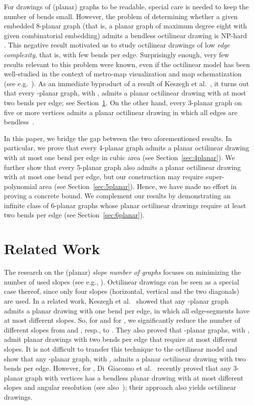 \documentclass[a4paper,twoside,11pt]{article}
\begin{document}
For drawings of (planar) graphs to be readable, special care is
needed to keep the number of bends small. However, the problem of
determining whether a given embedded 8-planar graph (that is, a
planar graph of maximum degree eight with given combinatorial
embedding) admits a bendless octilinear drawing is NP-hard
\cite{Noellenburg05}. This negative result motivated us to study
octilinear drawings of low \emph{edge complexity}, that is, with few
bends per edge. Surprisingly enough, very few results relevant to
this problem were known, even if the octilinear model has been
well-studied in the context of metro-map visualization and map
schematization (see e.g.~\cite{Wolff13}). As an immediate byproduct
of a result of Keszegh et al.~\cite{KPP13}, it turns out that every
-planar graph, with , admits a planar octilinear
drawing with at most two bends per edge; see
Section~\ref{sec:relatedwork}. On the other hand, every 3-planar
graph on five or more vertices admits a planar octilinear drawing in
which all edges are bendless~\cite{GLM14,Kant92}.

In this paper, we bridge the gap between the two aforementioned
results. In particular, we prove that every 4-planar graph admits a
planar octilinear drawing with at most one bend per edge in cubic
area (see Section~\ref{sec:4planar}). We further show that every
5-planar graph also admits a planar octilinear drawing with at most
one bend per edge, but our construction may require super-polynomial
area (see Section~\ref{sec:5planar}). Hence, we have made no effort
in proving a concrete bound. We complement our results by
demonstrating an infinite class of 6-planar graphs whose planar
octilinear drawings require at least two bends per edge (see
Section~\ref{sec:6planar}).

\section{Related Work}
\label{sec:relatedwork}


The research on the (planar) \emph{slope number of graphs} focuses
on minimizing the number of used slopes (see e.g.,
\cite{JJ13,KPP13,KPPT08,LLMN13,MP11}). Octilinear drawings can be
seen as a special case thereof, since only four slopes (horizontal,
vertical and the two diagonals) are used. In a related work, Keszegh
et al.~\cite{KPP13} showed that any -planar graph admits a planar
drawing with one bend per edge, in which all edge-segments have at
most  different slopes. So, for  and for , we
significantly reduce the number of different slopes from  and
, resp., to . They also proved that -planar graphs, with
, admit planar drawings with two bends per edge that
require at most  different slopes. It is
not difficult to transfer this technique to the octilinear model and
show that any -planar graph, with , admits a
planar octilinear drawing with two bends per edge. However, for
, Di~Giacomo et al.~\cite{GLM14} recently proved that any
3-planar graph with  vertices has a bendless planar
drawing with at most  different slopes and angular resolution
 (see also~\cite{Kant92}); their approach also yields
octilinear drawings.
\end{document}
